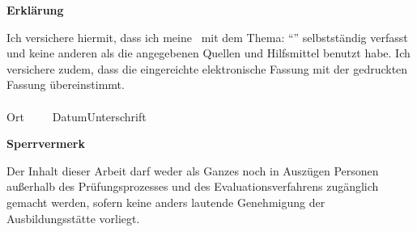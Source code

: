

\newpage
\thispagestyle{empty}
\begin{framed}
    \begin{center}
        \Large\bfseries Erklärung
    \end{center}
    \medskip
    \noindent
    Ich versichere hiermit, dass ich meine \Was\ mit dem Thema:
    \enquote{\Titel}
    selbstständig verfasst und keine anderen als die angegebenen Quellen und Hilfsmittel benutzt habe. Ich versichere zudem, dass die eingereichte elektronische Fassung mit der gedruckten Fassung übereinstimmt.\\[3cm]
    \underline{\hspace{4cm}}\hfill\underline{\hspace{6cm}}\\
    Ort~~~~~Datum\hfill Unterschrift\hspace{4cm}
\end{framed}

\vfill
\begin{framed}
    \begin{center}
        \Large\bfseries Sperrvermerk
    \end{center}
    \medskip
    \noindent
    Der Inhalt dieser Arbeit darf weder als Ganzes noch in Auszügen Personen
    außerhalb des Prüfungsprozesses und des Evaluationsverfahrens zugänglich gemacht
    werden, sofern keine anders lautende Genehmigung der Ausbildungsstätte vorliegt.
\end{framed}

\endinput
